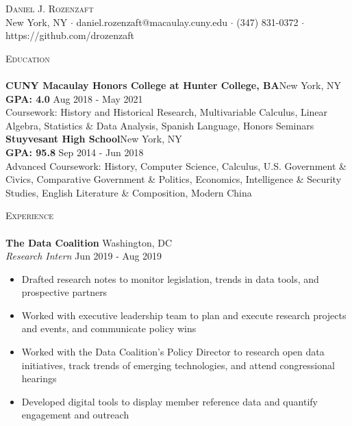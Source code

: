 \documentclass[a4paper]{article}
\newcommand{\lineunder} {
    \vspace*{-8pt} \\
    \hspace*{-18pt} \hrulefill \\
}
\newcommand{\header} [1] {
    {\hspace*{-18pt}\vspace*{6pt} \textsc{#1}}
    \vspace*{-6pt} \lineunder
}
\begin{document}

\begin{center}

  {\Huge \scshape \vspace{-13mm} \hspace{-8mm} {Daniel J. Rozenzaft} \vspace{1mm}}\\
  \hspace{-5mm}  New York, NY $\cdot$ daniel.rozenzaft@macaulay.cuny.edu $\cdot$ (347) 831-0372 $\cdot$ https://github.com/drozenzaft\\
\end{center} \vspace{1mm}
\header{Education}
\textbf{CUNY Macaulay Honors College at Hunter College, BA}\hfill New York, NY\\
\vspace{.5mm} \textbf{GPA: 4.0} 
\hfill Aug 2018 - May 2021\\ \vspace{1mm}
Coursework: History and Historical Research, Multivariable Calculus, Linear Algebra, Statistics \& Data Analysis, Spanish Language, Honors Seminars\\ 
\vspace{3mm}
\textbf{Stuyvesant High School}\hfill New York, NY\\
\vspace{.5mm} \textbf{GPA: 95.8} \hfill Sep 2014 - Jun 2018\\ \vspace{1mm}
Advanced Coursework: History, Computer Science, Calculus, U.S. Government \& Civics, Comparative Government \& Politics, Economics, Intelligence \& Security Studies, English Literature \& Composition, Modern China\\
\vspace{3mm}
\header{Experience}
\textbf{The Data Coalition} \hfill Washington, DC\\
\textit{Research Intern} \hfill Jun 2019 - Aug 2019\\
\vspace{-1mm}
\begin{itemize} \itemsep 1pt
  \item  Drafted research notes to monitor legislation, trends in data tools, and prospective partners
  \item  Worked with executive leadership team to plan and execute research projects and events, and communicate policy wins 
  \item  Worked with the Data Coalition’s Policy Director to research open data initiatives, track trends of emerging technologies, and attend congressional hearings
  \item  Developed digital tools to display member reference data and quantify engagement and outreach
\end{itemize}
\end{document}

